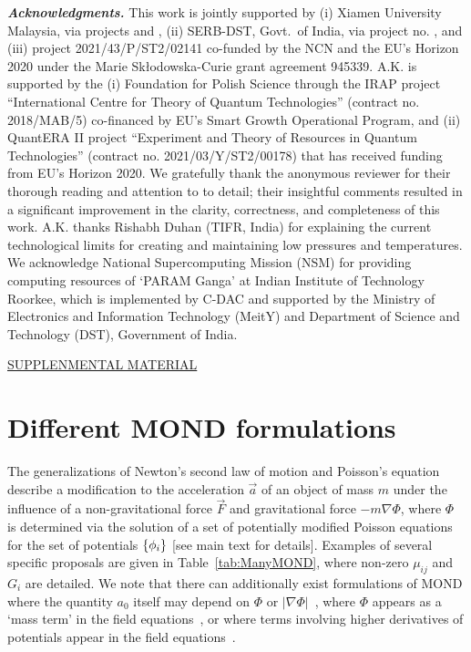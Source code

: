 \documentclass[aps,prd,reprint,superscriptaddress,nofootinbib,floatfix]{revtex4-2}
\begin{document}
\emph{\textbf{Acknowledgments.}}
This work is jointly supported by 
(i) Xiamen University Malaysia,
via projects  and ,
(ii) SERB-DST, Govt.~of India, via project no. , and
(iii) project 2021/43/P/ST2/02141 co-funded by the NCN and the EU's Horizon 2020 under the Marie Sk\l{}odowska-Curie grant agreement 945339. 
A.K. is supported by the (i) Foundation for Polish Science through the IRAP project ``International Centre for Theory of Quantum Technologies'' (contract no. 2018/MAB/5) co-financed by EU's Smart Growth Operational Program, and 
(ii) QuantERA II project ``Experiment and Theory of Resources in Quantum Technologies'' (contract no. 2021/03/Y/ST2/00178) that has received funding from EU’s Horizon 2020. We gratefully thank the anonymous reviewer for their thorough reading and attention to to detail; their insightful comments resulted in a significant improvement in the clarity, correctness, and completeness of this work. 
A.K. thanks Rishabh Duhan (TIFR, India) for explaining the current technological limits for creating and maintaining low pressures and temperatures.
We acknowledge National Supercomputing Mission (NSM) for providing computing resources of `PARAM Ganga' at Indian Institute of Technology Roorkee, which is implemented by C-DAC and supported by the Ministry of Electronics and Information Technology (MeitY) and Department of Science and Technology (DST), Government of India. 


%
%




\cleardoublepage
\begin{center}
\LARGE
\underline{SUPPLENMENTAL MATERIAL}
\end{center}



\section*{Different MOND formulations}


The generalizations of Newton's second law of motion and Poisson's equation describe a modification to the acceleration $\vec{a}$ of an object of mass $m$ under the influence of a non-gravitational force $\vec{F}$ and gravitational force $-m{\nabla}\Phi$, where $\Phi$ is determined via the solution of a set of potentially modified Poisson equations for the set of potentials $\qty{\phi_{i}}$ [see main text for details]. 
Examples of several specific proposals are given in Table~\ref{tab:ManyMOND}, where non-zero $\mu_{ij}$ and $G_{i}$ are detailed.
We note that there can additionally exist formulations of MOND where the quantity $a_{0}$ itself may depend on $\Phi$ or $|\nabla \Phi|$~\cite{MOND2Body-Zhao2010}, where $\Phi$ appears as a `mass term' in the field equations~\cite{RMOND-Zlosnik2021}, or where terms involving higher derivatives of potentials appear in the field equations~\cite{MOND-General-Milgrom2023}.
\end{document}
